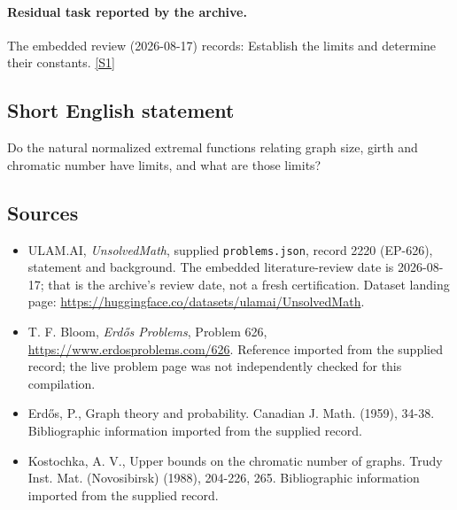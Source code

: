 \documentclass[11pt,a4paper]{article}
\newcommand{\sref}[2]{\hyperlink{source:#1:#2}{[S#2]}}
\begin{document}
\paragraph{Residual task reported by the archive.}

The embedded review (2026-08-17) records: Establish the limits and determine their constants. \sref{2220}{1}

\subsection{Short English statement}

Do the natural normalized extremal functions relating graph size, girth and chromatic number have limits, and what are those limits?

\subsection{Sources}

{\small

\begin{itemize}

\item[\hypertarget{source:2220:1}{S1}] ULAM.AI, \emph{UnsolvedMath}, supplied \texttt{problems.json}, record 2220 (EP-626), statement and background. The embedded literature-review date is 2026-08-17; that is the archive’s review date, not a fresh certification. Dataset landing page: \url{https://huggingface.co/datasets/ulamai/UnsolvedMath}.

\item[\hypertarget{source:2220:2}{S2}] T. F. Bloom, \emph{Erdős Problems}, Problem 626, \url{https://www.erdosproblems.com/626}. Reference imported from the supplied record; the live problem page was not independently checked for this compilation.

\item[\hypertarget{source:2220:3}{S3}] Erd\H{o}s, P., Graph theory and probability. Canadian J. Math. (1959), 34-38. Bibliographic information imported from the supplied record.

\item[\hypertarget{source:2220:4}{S4}] Kostochka, A. V., Upper bounds on the chromatic number of graphs. Trudy Inst. Mat. (Novosibirsk) (1988), 204-226, 265. Bibliographic information imported from the supplied record.

\end{itemize}

}

\label{end:2220}
\end{document}
